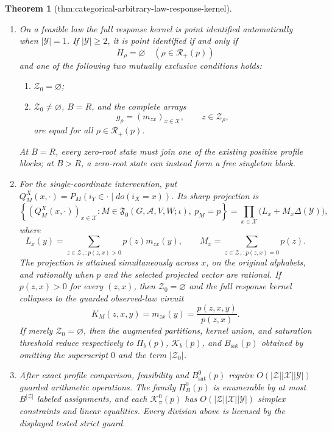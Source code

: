 \documentclass{article}
\newtheorem{theorem}{Theorem}
\begin{document}
\begin{theorem}[thm:categorical-arbitrary-law-response-kernel]
\begin{enumerate}
\(B_{\mathrm{sat}}^0(p)\) is the least hidden-alphabet cardinality at
which every unobserved response row can vary independently.
\item On a feasible law the full response kernel is point identified
automatically when \(\lvert\mathcal Y\rvert=1\).  If
\(\lvert\mathcal Y\rvert\geq2\), it is point identified if and only if
\[
 H_\rho=\varnothing\quad(\rho\in\mathcal R_+(p))
\]
and one of the following two mutually exclusive conditions holds:
\begin{enumerate}
\item \(\mathcal Z_0=\varnothing\);
\item \(\mathcal Z_0\ne\varnothing\), \(B=R\), and the complete arrays
\[
 g_\rho=(m_{zx})_{x\in\mathcal X},\qquad z\in\mathcal Z_\rho,
\]
are equal for all \(\rho\in\mathcal R_+(p)\).
\end{enumerate}
At \(B=R\), every zero-root state must join one of the existing positive
profile blocks; at \(B>R\), a zero-root state can instead form a free
singleton block.
\item For the single-coordinate intervention, put
\(Q_M^X(x,\cdot)=P_M(i_Y\in\cdot\mid do(i_X=x))\).  Its sharp projection
is
\[
 \left\{(Q_M^X(x,\cdot))_{x\in\mathcal X}:
 M\in\mathfrak F_0(G,\mathcal A,V,W;\iota),\ p_M=p\right\}
 =\prod_{x\in\mathcal X}\bigl(L_x+M_x\Delta(\mathcal Y)\bigr),
\]
where
\[
 L_x(y)=\sum_{z\in\mathcal Z_+:p(z,x)>0}p(z)m_{zx}(y),
 \qquad
 M_x=\sum_{z\in\mathcal Z_+:p(z,x)=0}p(z).
\]
The projection is attained simultaneously across \(x\), on the original
alphabets, and rationally when \(p\) and the selected projected vector are
rational.  If \(p(z,x)>0\) for every \((z,x)\), then
\(\mathcal Z_0=\varnothing\) and the full response kernel collapses to the
guarded observed-law circuit
\[
 K_M(z,x,y)=m_{zx}(y)=\frac{p(z,x,y)}{p(z,x)}.
\]
If merely \(\mathcal Z_0=\varnothing\), then the augmented partitions,
kernel union, and saturation threshold reduce respectively to
\(\Pi_b(p)\), \(\mathcal K_b(p)\), and
\(B_{\mathrm{sat}}(p)\) obtained by omitting the superscript \(0\) and
the term \(\lvert\mathcal Z_0\rvert\).
\item After exact profile comparison, feasibility and
\(B_{\mathrm{sat}}^0(p)\) require
\(O(\lvert\mathcal Z\rvert\lvert\mathcal X\rvert
\lvert\mathcal Y\rvert)\) guarded arithmetic operations.
The family \(\Pi_B^0(p)\) is enumerable by at most
\(B^{\lvert\mathcal Z\rvert}\) labeled assignments, and each
\(\mathcal K_\pi^0(p)\) has
\(O(\lvert\mathcal Z\rvert\lvert\mathcal X\rvert
\lvert\mathcal Y\rvert)\) simplex constraints and linear equalities.
Every division above is licensed by the displayed tested strict guard.
\end{enumerate}
\end{theorem}
\end{document}
